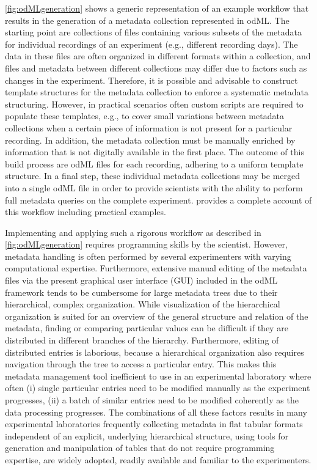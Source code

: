 {\cref{fig:odMLgeneration} shows a generic representation of an example workflow that results in the generation of a metadata collection represented in odML. The starting point are collections of files containing various subsets of the metadata for individual recordings of an experiment (e.g., different recording days). The data in these files are often organized in different formats within a collection, and files and metadata between different collections may differ due to factors such as changes in the experiment. Therefore, it is possible and advisable to construct template structures for the metadata collection to enforce a systematic metadata structuring. However, in practical scenarios often custom scripts are required to populate these templates, e.g., to cover small variations between metadata collections when a certain piece of information is not present for a particular recording. In addition, the metadata collection must be manually enriched by information that is not digitally available in the first place. The outcome of this build process are odML files for each recording, adhering to a uniform template structure. In a final step, these individual metadata collections may be merged into a single odML file in order to provide scientists with the ability to perform full metadata queries on the complete experiment. \citet{Zehl_2016} provides a complete account of this workflow including practical examples.

Implementing and applying such a rigorous workflow as described in \cref{fig:odMLgeneration} requires programming skills by the scientist. However, metadata handling is often performed by several experimenters with varying computational expertise. Furthermore, extensive manual editing of the metadata files via the present graphical user interface (GUI) included in the odML framework tends to be cumbersome for large metadata trees due to their hierarchical, complex organization. While visualization of the hierarchical organization is suited for an overview of the general structure and relation of the metadata, finding or comparing particular values can be difficult if they are distributed in different branches of the hierarchy. Furthermore, editing of distributed entries is laborious, because a hierarchical organization also requires navigation through the tree to access a particular entry. This makes this metadata management tool inefficient to use in an experimental laboratory where often (i) single particular entries need to be modified manually as the experiment progresses, (ii) a batch of similar entries need to be modified coherently as the data processing progresses. The combinations of all these factors results in many experimental laboratories frequently collecting metadata in flat tabular formats independent of an explicit, underlying hierarchical structure, using tools for generation and manipulation of tables that do not require programming expertise, are widely adopted, readily available and familiar to the experimenters.

}
